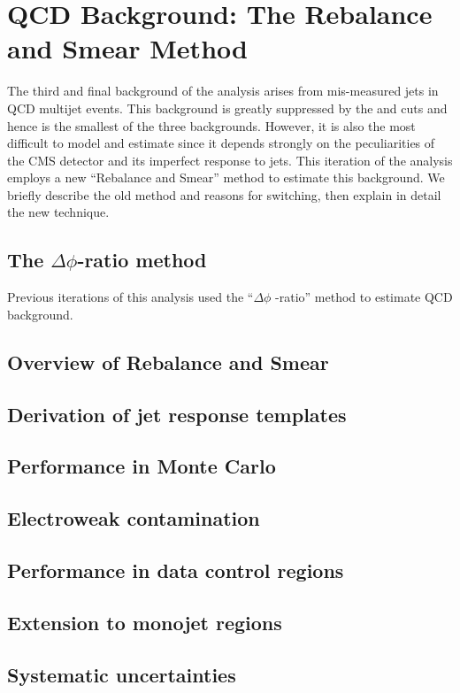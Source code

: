 \chapter{QCD Background: The Rebalance and Smear Method}

The third and final background of the \mttwo analysis arises from mis-measured
jets in QCD multijet events. This background is greatly suppressed by the
\mttwo and \dpmin cuts and hence is the smallest of the three backgrounds. 
However, it is also the most difficult to model and estimate since it depends
strongly on the peculiarities of the CMS detector and its imperfect response to jets.
This iteration of the analysis employs a new ``Rebalance and Smear'' method 
to estimate this background. We briefly describe the old method and reasons 
for switching, then explain in detail the new technique.

\section{The $\Delta\phi$-ratio method}
Previous iterations of this analysis \cite{CMS:mt22016,CMS:mt22015} 
used the ``$\Delta\phi$ -ratio'' method to estimate QCD background.

\section{Overview of Rebalance and Smear}

\section{Derivation of jet response templates}

\section{Performance in Monte Carlo}

\section{Electroweak contamination}

\section{Performance in data control regions}

\section{Extension to monojet regions}

\section{Systematic uncertainties}
